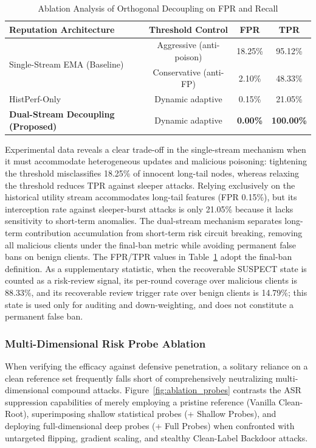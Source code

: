 \documentclass[final,5p,times,twocolumn]{elsarticle/elsarticle}
\begin{document}
\begin{table}[t]
    \centering
    \caption{Ablation Analysis of Orthogonal Decoupling on FPR and Recall}
    \label{tab:ablation_stream}
    \begin{tabular}{l c c c}
        \toprule
        \textbf{Reputation Architecture}              & \textbf{Threshold Control} & \textbf{FPR}    & \textbf{TPR}      \\
        \midrule
        \multirow{2}{*}{Single-Stream EMA (Baseline)} & Aggressive (anti-poison)   & 18.25\%         & 95.12\%           \\
                                                      & Conservative (anti-FP)     & 2.10\%          & 48.33\%           \\
        \midrule
        HistPerf-Only                                 & Dynamic adaptive           & 0.15\%          & 21.05\%           \\
        \textbf{Dual-Stream Decoupling (Proposed)}    & Dynamic adaptive           & \textbf{0.00\%} & \textbf{100.00\%} \\
        \bottomrule
    \end{tabular}
\end{table}

Experimental data reveals a clear trade-off in the single-stream mechanism when it must accommodate heterogeneous updates and malicious poisoning: tightening the threshold misclassifies 18.25\% of innocent long-tail nodes, whereas relaxing the threshold reduces TPR against sleeper attacks. Relying exclusively on the historical utility stream accommodates long-tail features (FPR 0.15\%), but its interception rate against sleeper-burst attacks is only 21.05\% because it lacks sensitivity to short-term anomalies. The dual-stream mechanism separates long-term contribution accumulation from short-term risk circuit breaking, removing all malicious clients under the final-ban metric while avoiding permanent false bans on benign clients. The FPR/TPR values in Table~\ref{tab:ablation_stream} adopt the final-ban definition. As a supplementary statistic, when the recoverable SUSPECT state is counted as a risk-review signal, its per-round coverage over malicious clients is 88.33\%, and its recoverable review trigger rate over benign clients is 14.79\%; this state is used only for auditing and down-weighting, and does not constitute a permanent false ban.

\subsubsection{Multi-Dimensional Risk Probe Ablation}
When verifying the efficacy against defensive penetration, a solitary reliance on a clean reference set frequently falls short of comprehensively neutralizing multi-dimensional compound attacks. Figure~\ref{fig:ablation_probes} contrasts the ASR suppression capabilities of merely employing a pristine reference (Vanilla Clean-Root), superimposing shallow statistical probes (+ Shallow Probes), and deploying full-dimensional deep probes (+ Full Probes) when confronted with untargeted flipping, gradient scaling, and stealthy Clean-Label Backdoor attacks.
\end{document}
